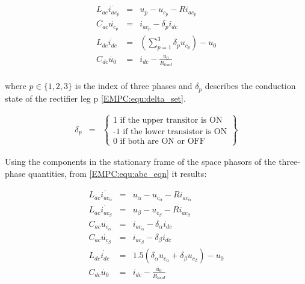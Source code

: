         \begin{equation}
        \begin{array}{rcl}
            L_{ac}\dot{i_{ac_p}}&=&u_p-u_{c_p}-Ri_{ac_p}\\
            C_{ac}\dot{u_{c_p}}&=&i_{ac_p}-\delta_pi_{dc}\\
            L_{dc}\dot{i_{dc}}&=&(\sum_{p=1}^{3}\delta_pu_{c_p})-u_0\\
            C_{dc}\dot{u_0}&=&i_{dc}-\frac{u_0}{R_{load}}\\
        \end{array}
        \label{EMPC:equ:abc_eqn}
    \end{equation}

    where $p\in\{1,2,3\}$ is the index of three phases and $\delta_p$ describes the conduction state of the rectifier leg p \ref{EMPC:equ:delta_set}.

    \begin{equation}
        \begin{array}{rcl}
            \delta_p&=&\begin{Bmatrix}
                \textrm{1 if the upper transitor is ON}\\
                \textrm{-1 if the lower transistor is ON}\\
                \textrm{0 if both are ON or OFF}
            \end{Bmatrix}
        \end{array}
        \label{EMPC:equ:delta_set}
    \end{equation}

    Using the components in the stationary frame of the space phasors of the three-phase quantities, from \ref{EMPC:equ:abc_eqn} it results:

    \begin{equation}
        \begin{array}{rcl}
            L_{ac}\dot{i_{ac_\alpha}}&=&u_\alpha-u_{c_\alpha}-Ri_{ac_\alpha}\\
            L_{ac}\dot{i_{ac_\beta}}&=&u_\beta-u_{c_\beta}-Ri_{ac_\beta}\\
            C_{ac}\dot{u_{c_\alpha}}&=&i_{ac_\alpha}-\delta_\alpha i_{dc}\\
            C_{ac}\dot{u_{c_\beta}}&=&i_{ac_\beta}-\delta_\beta i_{dc}\\
            L_{dc}\dot{i_{dc}}&=&1.5(\delta_\alpha u_{c_\alpha}+\delta_\beta u_{c_\beta})-u_0\\
            C_{dc}\dot{u_0}&=&i_{dc}-\frac{u_0}{R_{load}}\\
        \end{array}
        \label{EMPC:equ:abc_alfabeta}
    \end{equation}

